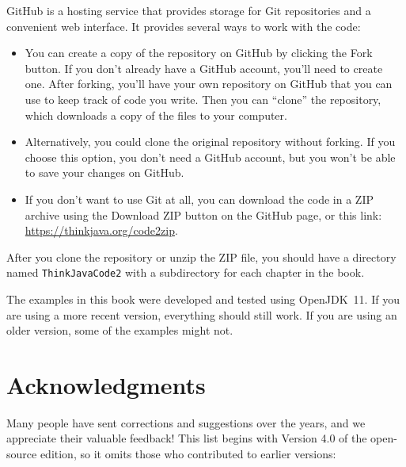 
GitHub is a hosting service that provides storage for Git repositories and a convenient web interface.
It provides several ways to work with the code:

\begin{itemize}

\item You can create a copy of the repository on GitHub by clicking the {\sf Fork} button.
If you don't already have a GitHub account, you'll need to create one.
After forking, you'll have your own repository on GitHub that you can use to keep track of code you write.
Then you can ``clone'' the repository, which downloads a copy of the files to your computer.

\item Alternatively, you could clone the original repository without forking.
If you choose this option, you don't need a GitHub account, but you won't be able to save your changes on GitHub.

\item If you don't want to use Git at all, you can download the code in a ZIP archive using the {\sf Download ZIP} button on the GitHub page, or this link: \url{https://thinkjava.org/code2zip}.

\end{itemize}

After you clone the repository or unzip the ZIP file, you should have a directory named {\tt ThinkJavaCode2} with a subdirectory for each chapter in the book.

The examples in this book were developed and tested using OpenJDK~11.
If you are using a more recent version, everything should still work.
If you are using an older version, some of the examples might not.


\section*{Acknowledgments}

Many people have sent corrections and suggestions over the years, and we appreciate their valuable feedback!
This list begins with Version 4.0 of the open-source edition, so it omits those who contributed to earlier versions:

